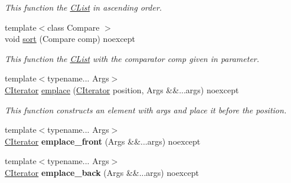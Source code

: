 \begin{DoxyCompactItemize}
\begin{DoxyCompactList}\small\item\em This function the \hyperlink{classnsSdD_1_1CList}{C\+List} in ascending order. \end{DoxyCompactList}\item 
{\footnotesize template$<$class Compare $>$ }\\void \hyperlink{classnsSdD_1_1CList_acef43a041947820896c05b2107d68abf}{sort} (Compare comp) noexcept
\begin{DoxyCompactList}\small\item\em This function the \hyperlink{classnsSdD_1_1CList}{C\+List} with the comparator {\ttfamily comp} given in parameter. \end{DoxyCompactList}\item 
{\footnotesize template$<$typename... Args$>$ }\\\hyperlink{structnsSdD_1_1CList_1_1CIterator}{C\+Iterator} \hyperlink{classnsSdD_1_1CList_a49f58c34b74458b09b8108ed373853eb}{emplace} (\hyperlink{structnsSdD_1_1CList_1_1CIterator}{C\+Iterator} position, Args \&\&...args) noexcept
\begin{DoxyCompactList}\small\item\em This function constructs an element with {\ttfamily args} and place it before the {\ttfamily position}. \end{DoxyCompactList}\item 
\hypertarget{classnsSdD_1_1CList_ab844fdde0b92d0dd585036a1a1fbfbae}{{\footnotesize template$<$typename... Args$>$ }\\\hyperlink{structnsSdD_1_1CList_1_1CIterator}{C\+Iterator} {\bfseries emplace\+\_\+front} (Args \&\&...args) noexcept}\label{classnsSdD_1_1CList_ab844fdde0b92d0dd585036a1a1fbfbae}

\item 
\hypertarget{classnsSdD_1_1CList_ab7f5a029be59e05e79cf1ea033b8171b}{{\footnotesize template$<$typename... Args$>$ }\\\hyperlink{structnsSdD_1_1CList_1_1CIterator}{C\+Iterator} {\bfseries emplace\+\_\+back} (Args \&\&...args) noexcept}\label{classnsSdD_1_1CList_ab7f5a029be59e05e79cf1ea033b8171b}


\end{DoxyCompactItemize}

